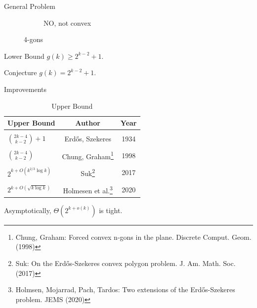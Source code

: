 \documentclass{beamer}
\begin{document}
\begin{frame}{General Problem}
{\begin{figure}
\begin{subfigure}[t]{0.3\textwidth}
        \caption{NO, not convex}
        \label{fignot4gon}
    \end{subfigure}
\caption{4-gons}
\label{figgons}
\end{figure}

}
{} {
\begin{block}{Lower Bound}
    $g(k) \ge 2^{k-2} + 1$.
\end{block}

\begin{alertblock}{Conjecture}
    $g(k) = 2^{k-2} + 1$.
\end{alertblock}
}

\end{frame}

\begin{frame}{Improvements}

\begin{table}
\begin{tabular}{l | c | c }
Upper Bound & Author & Year  \\
\hline \hline
\\
$\binom{2k-4}{k-2} + 1$ & Erd\H{o}s, Szekeres & 1934 \\
\\
$\binom{2k-4}{k-2}$ & Chung, Graham\footnote{Chung, Graham: Forced convex n-gons in the plane. Discrete Comput. Geom. (1998)} & 1998 \\
\\
$2^{k + O(k ^{2/3} \log k)}$ & Suk\footnote{Suk: On the Erd\H{o}s-Szekeres convex polygon problem. J. Am. Math. Soc. (2017)} & 2017 \\
\\
$2^{k + O(\sqrt{k \log k})}$ & Holmesen et al.\footnote{Holmsen, Mojarrad, Pach, Tardos: Two extensions of the Erd\H{o}s-Szekeres problem. JEMS (2020)} & 2020
\end{tabular}
\caption{Upper Bound}
\end{table}

Asymptotically, $\Theta(2^{k+o(k)})$ is tight.

\end{frame}
\end{document}

